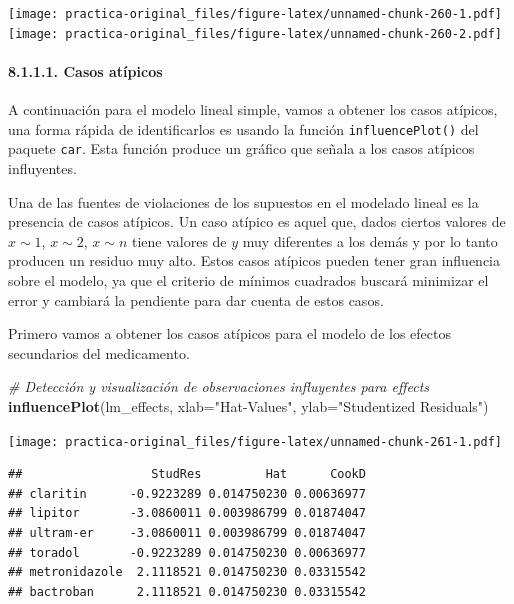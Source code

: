 \documentclass[spanish,]{article}
\newenvironment{Shaded}{\begin{snugshade}}{\end{snugshade}}
\newcommand{\KeywordTok}[1]{\textcolor[rgb]{0.13,0.29,0.53}{\textbf{#1}}}
\newcommand{\DataTypeTok}[1]{\textcolor[rgb]{0.13,0.29,0.53}{#1}}
\newcommand{\StringTok}[1]{\textcolor[rgb]{0.31,0.60,0.02}{#1}}
\newcommand{\CommentTok}[1]{\textcolor[rgb]{0.56,0.35,0.01}{\textit{#1}}}
\newcommand{\NormalTok}[1]{#1}
\let\oldparagraph\paragraph
\renewcommand{\paragraph}[1]{\oldparagraph{#1}\mbox{}}
\begin{document}
\texttt{[image: practica-original\_files/figure-latex/unnamed-chunk-260-1.pdf]}
\texttt{[image: practica-original\_files/figure-latex/unnamed-chunk-260-2.pdf]}

\paragraph{8.1.1.1. Casos atípicos}\label{casos-atipicos}

A continuación para el modelo lineal simple, vamos a obtener los casos
atípicos, una forma rápida de identificarlos es usando la función
\texttt{influencePlot()} del paquete \texttt{car}. Esta función produce
un gráfico que señala a los casos atípicos influyentes.

Una de las fuentes de violaciones de los supuestos en el modelado lineal
es la presencia de casos atípicos. Un caso atípico es aquel que, dados
ciertos valores de \(x \sim 1\), \(x \sim 2\), \(x \sim n\) tiene
valores de \(y\) muy diferentes a los demás y por lo tanto producen un
residuo muy alto. Estos casos atípicos pueden tener gran influencia
sobre el modelo, ya que el criterio de mínimos cuadrados buscará
minimizar el error y cambiará la pendiente para dar cuenta de estos
casos.

Primero vamos a obtener los casos atípicos para el modelo de los efectos
secundarios del medicamento.

\begin{Shaded}
\begin{Highlighting}[]
\CommentTok{# Detección y visualización de observaciones influyentes para effects}
\KeywordTok{influencePlot}\NormalTok{(lm_effects, }\DataTypeTok{xlab=}\StringTok{"Hat-Values"}\NormalTok{, }\DataTypeTok{ylab=}\StringTok{"Studentized Residuals"}\NormalTok{)}
\end{Highlighting}
\end{Shaded}

\texttt{[image: practica-original\_files/figure-latex/unnamed-chunk-261-1.pdf]}

\begin{verbatim}
##                  StudRes         Hat      CookD
## claritin      -0.9223289 0.014750230 0.00636977
## lipitor       -3.0860011 0.003986799 0.01874047
## ultram-er     -3.0860011 0.003986799 0.01874047
## toradol       -0.9223289 0.014750230 0.00636977
## metronidazole  2.1118521 0.014750230 0.03315542
## bactroban      2.1118521 0.014750230 0.03315542
\end{verbatim}
\end{document}
